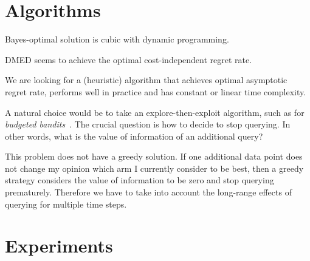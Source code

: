 \documentclass[a4paper]{article}
\begin{document}
\section{Algorithms}

Bayes-optimal solution is cubic with dynamic programming.

DMED seems to achieve the optimal cost-independent regret rate.

We are looking for a (heuristic) algorithm that achieves optimal asymptotic regret rate, performs well in practice and has constant or linear time complexity.

A natural choice would be to take an explore-then-exploit algorithm, such as for \emph{budgeted bandits}~\citep{...}.
The crucial question is how to decide to stop querying.
In other words, what is the value of information of an additional query?

This problem does not have a greedy solution.
If one additional data point does not change my opinion
which arm I currently consider to be best,
then a greedy strategy considers the value of information to be zero and stop querying prematurely.
Therefore we have to take into account the long-range effects of querying for multiple time steps.


\section{Experiments}

\iffalse
Algorithms:
* vanilla DMED (with commitment when 1 arm is selected?)
* partial monitoring algorithm (?)
* optimal stopping time (optimized problem-dependent)
* heuristic (with optimized alpha)

Problems:
* medium query cost c = 2 (>> gap)
  * horizon n = 10k vs gap 0.1 (< n^2/3)
  * horizon n = 1k vs gap 0.1 (~ n^2/3)
  * horizon n = 10k vs gap 0.01 (don't identify the arms)
* high query cost c = 50
  * horizon n = 10k vs gap 0.3 (pay to identify)
  * horizon n = 10k vs gap 0.1 (borderline case)
  * horizon n = 10k vs gap 0.05 (do not pay to identify)
* low query cost c = 0.01 (c << gap)
  * horizon n = 10k vs gap 0.1 (should almost always find the best arm)
  * horizon n = 200 vs gap 0.1 (query all the way?)
\fi


\end{document}
